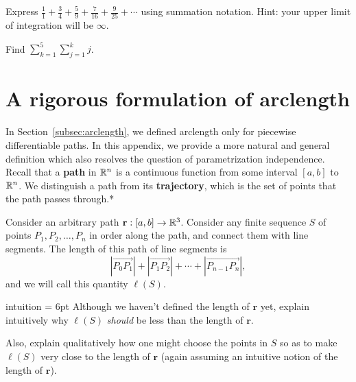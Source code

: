 \documentclass{watsonbook}
\begin{document}
  \begin{exercise}{}{}
    Express $\tfrac{1}{1} + \tfrac{3}{4} + \tfrac{5}{9} +
    \tfrac{7}{16} + \tfrac{9}{25} + \cdots$ using summation
    notation. Hint: your upper limit of integration will be $\infty$. 
  \end{exercise}
  
  \begin{exercise}{}{}
    Find $\displaystyle{\sum_{k=1}^5\sum_{j=1}^k j }$. 
  \end{exercise}
  
  \newpage

  \section{A rigorous formulation of arclength}
  \label{sec:arclengthappendix}

  In Section~\ref{subsec:arclength}, we defined arclength only for
  piecewise differentiable paths. In this appendix, we provide a more
  natural and general definition which also resolves the question of
  parametrization independence. Recall that a \textbf{path} in $\mathbb{R}^n$
  is a continuous function from some interval $[a,b]$ to $\mathbb{R}^n$. We
  distinguish a path from its \textbf{trajectory}, which is the set of
  points that the path passes through.* 

  Consider an arbitrary path $\mathbf{r}:[a,b] \to \mathbb{R}^3$. Consider any finite sequence
  $S$ of points $P_1, P_2, \ldots, P_n$ in order along the path, and
  connect them with line segments. The length of this path of line
  segments is
  \[
    |\overrightarrow{P_0P_1}| +
    |\overrightarrow{P_1P_2}| + \cdots +
    |\overrightarrow{P_{n-1}P_n}|, 
  \]
  and we will call this quantity $\ell(S)$.

  \begin{exercise}{}{intuition} \parskip = 6pt 
    Although we haven't defined the length of $\mathbf{r}$ yet, explain
    intuitively why $\ell(S)$ \textit{should} be less than the length of
    $\mathbf{r}$.

    Also, explain qualitatively how one might choose the points in $S$
    so as to make $\ell(S)$ very close to the length of $\mathbf{r}$
    (again assuming an intuitive notion of the length of $\mathbf{r}$).
  \end{exercise}
\end{document}
